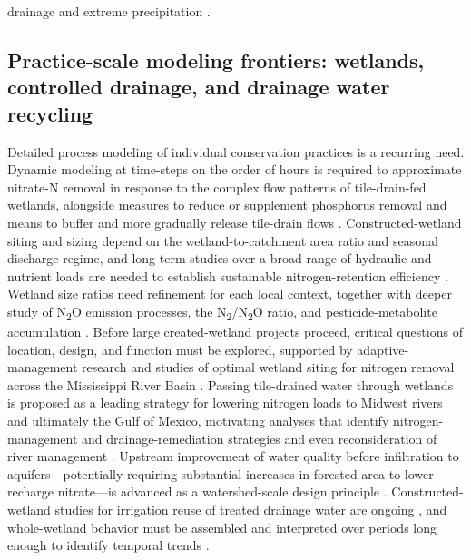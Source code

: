 \documentclass[11pt]{article}
\begin{document}
drainage and extreme precipitation \parencite{Dalzell2011,Bellmore2015}.

\subsection{Practice-scale modeling frontiers: wetlands, controlled drainage, and drainage water recycling}

Detailed process modeling of individual conservation practices is a recurring need. Dynamic modeling at time-steps on the order of hours is required to approximate nitrate-N removal in response to the complex flow patterns of tile-drain-fed wetlands, alongside measures to reduce or supplement phosphorus removal and means to buffer and more gradually release tile-drain flows \parencite{Tanner2011}. Constructed-wetland siting and sizing depend on the wetland-to-catchment area ratio and seasonal discharge regime, and long-term studies over a broad range of hydraulic and nutrient loads are needed to establish sustainable nitrogen-retention efficiency \parencite{Steidl2019}. Wetland size ratios need refinement for each local context, together with deeper study of N\textsubscript{2}O emission processes, the N\textsubscript{2}/N\textsubscript{2}O ratio, and pesticide-metabolite accumulation \parencite{Tournebize2017}. Before large created-wetland projects proceed, critical questions of location, design, and function must be explored, supported by adaptive-management research and studies of optimal wetland siting for nitrogen removal across the Mississippi River Basin \parencite{Kovacic2006}. Passing tile-drained water through wetlands is proposed as a leading strategy for lowering nitrogen loads to Midwest rivers and ultimately the Gulf of Mexico, motivating analyses that identify nitrogen-management and drainage-remediation strategies and even reconsideration of river management \parencite{Baeumler2020}. Upstream improvement of water quality before infiltration to aquifers---potentially requiring substantial increases in forested area to lower recharge nitrate---is advanced as a watershed-scale design principle \parencite{Billy2013}. Constructed-wetland studies for irrigation reuse of treated drainage water are ongoing \parencite{Madramootoo2007}, and whole-wetland behavior must be assembled and interpreted over periods long enough to identify temporal trends \parencite{Kadlec2012}.
\end{document}
